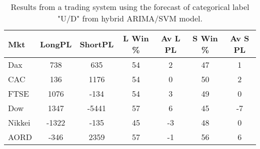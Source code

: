 \begin{table}[ht]
\centering
\caption[Results from a trading system using the forecast of categorical label "U/D" from hybrid ARIMA/SVM model]{Results from a trading system using the forecast of categorical label "U/D" from hybrid ARIMA/SVM model.} 
\label{tab:chp_ts:pUD_CAT_arima_svm_sys}
\begin{tabular}{lcccccc}
  \toprule Mkt & LongPL & ShortPL & L Win \% & Av L PL & S Win \% & Av S PL \\ 
  \midrule Dax & 738 & 635 & 54 & 2 & 47 & 1 \\ 
  CAC & 136 & 1176 & 54 & 0 & 50 & 2 \\ 
  FTSE & 1076 & -134 & 54 & 3 & 49 & 0 \\ 
  Dow & 1347 & -5441 & 57 & 6 & 45 & -7 \\ 
  Nikkei & -1322 & -135 & 45 & -3 & 48 & 0 \\ 
  AORD & -346 & 2359 & 57 & -1 & 56 & 6 \\ 
   \bottomrule \end{tabular}
\end{table}
